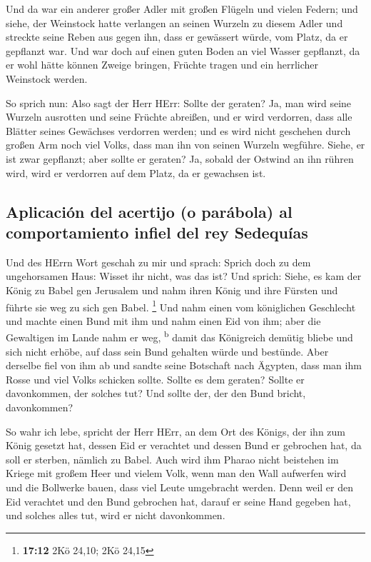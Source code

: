  Und da war ein anderer großer Adler mit großen Flügeln
und vielen Federn; und siehe, der Weinstock hatte verlangen an seinen
Wurzeln zu diesem Adler und streckte seine Reben aus gegen ihn, dass er
gewässert würde, vom Platz, da er gepflanzt war.  Und war
doch auf einen guten Boden an viel Wasser gepflanzt, da er wohl hätte
können Zweige bringen, Früchte tragen und ein herrlicher Weinstock
werden.

 So sprich nun: Also sagt der Herr HErr: Sollte der
geraten? Ja, man wird seine Wurzeln ausrotten und seine Früchte
abreißen, und er wird verdorren, dass alle Blätter seines Gewächses
verdorren werden; und es wird nicht geschehen durch großen Arm noch viel
Volks, dass man ihn von seinen Wurzeln wegführe.  Siehe,
er ist zwar gepflanzt; aber sollte er geraten? Ja, sobald der Ostwind an
ihn rühren wird, wird er verdorren auf dem Platz, da er gewachsen ist.

\hypertarget{aplicaciuxf3n-del-acertijo-o-paruxe1bola-al-comportamiento-infiel-del-rey-sedequuxedas}{%
\subsection{Aplicación del acertijo (o parábola) al comportamiento
infiel del rey
Sedequías}\label{aplicaciuxf3n-del-acertijo-o-paruxe1bola-al-comportamiento-infiel-del-rey-sedequuxedas}}

 Und des HErrn Wort geschah zu mir und sprach:
 Sprich doch zu dem ungehorsamen Haus: Wisset ihr nicht,
was das ist? Und sprich: Siehe, es kam der König zu Babel gen Jerusalem
und nahm ihren König und ihre Fürsten und führte sie weg zu sich gen
Babel. \footnote{\textbf{17:12} 2Kö 24,10; 2Kö 24,15} 
Und nahm einen vom königlichen Geschlecht und machte einen Bund mit ihm
und nahm einen Eid von ihm; aber die Gewaltigen im Lande nahm er weg,
\textsuperscript{b}  damit das Königreich demütig bliebe
und sich nicht erhöbe, auf dass sein Bund gehalten würde und bestünde.
 Aber derselbe fiel von ihm ab und sandte seine Botschaft
nach Ägypten, dass man ihm Rosse und viel Volks schicken sollte. Sollte
es dem geraten? Sollte er davonkommen, der solches tut? Und sollte der,
der den Bund bricht, davonkommen?

 So wahr ich lebe, spricht der Herr HErr, an dem Ort des
Königs, der ihn zum König gesetzt hat, dessen Eid er verachtet und
dessen Bund er gebrochen hat, da soll er sterben, nämlich zu Babel.
 Auch wird ihm Pharao nicht beistehen im Kriege mit
großem Heer und vielem Volk, wenn man den Wall aufwerfen wird und die
Bollwerke bauen, dass viel Leute umgebracht werden.  Denn
weil er den Eid verachtet und den Bund gebrochen hat, darauf er seine
Hand gegeben hat, und solches alles tut, wird er nicht davonkommen.

